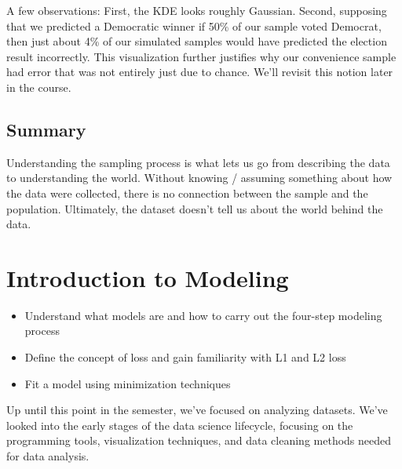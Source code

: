 \documentclass[
  letterpaper,
  DIV=11,
  numbers=noendperiod]{scrreprt}
\providecommand{\tightlist}{%
  \setlength{\itemsep}{0pt}\setlength{\parskip}{0pt}}\usepackage{longtable,booktabs,array}
\begin{document}
A few observations: First, the KDE looks roughly Gaussian. Second,
supposing that we predicted a Democratic winner if 50\% of our sample
voted Democrat, then just about 4\% of our simulated samples would have
predicted the election result incorrectly. This visualization further
justifies why our convenience sample had error that was not entirely
just due to chance. We'll revisit this notion later in the course.

\hypertarget{summary}{%
\section{Summary}\label{summary}}

Understanding the sampling process is what lets us go from describing
the data to understanding the world. Without knowing / assuming
something about how the data were collected, there is no connection
between the sample and the population. Ultimately, the dataset doesn't
tell us about the world behind the data.


\hypertarget{introduction-to-modeling}{%
\chapter{Introduction to Modeling}\label{introduction-to-modeling}}

\begin{tcolorbox}[enhanced jigsaw, rightrule=.15mm, opacityback=0, colbacktitle=quarto-callout-note-color!10!white, opacitybacktitle=0.6, coltitle=black, toptitle=1mm, colback=white, toprule=.15mm, leftrule=.75mm, breakable, bottomtitle=1mm, bottomrule=.15mm, arc=.35mm, title=\textcolor{quarto-callout-note-color}{\faInfo}\hspace{0.5em}{Note}, colframe=quarto-callout-note-color-frame, titlerule=0mm, left=2mm]

\begin{itemize}
\tightlist
\item
  Understand what models are and how to carry out the four-step modeling
  process
\item
  Define the concept of loss and gain familiarity with L1 and L2 loss
\item
  Fit a model using minimization techniques
\end{itemize}

\end{tcolorbox}

Up until this point in the semester, we've focused on analyzing
datasets. We've looked into the early stages of the data science
lifecycle, focusing on the programming tools, visualization techniques,
and data cleaning methods needed for data analysis.
\end{document}

